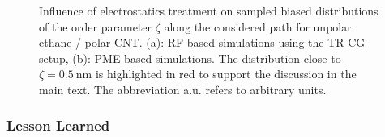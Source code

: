 \documentclass[9pt,lessons,pubversion]{livecoms}
\begin{document}
\begin{figure}[htb!]
  \centering    
  \caption{
  Influence of electrostatics treatment on sampled biased distributions of the order parameter $\zeta$ along the considered path for unpolar ethane / polar CNT. 
  (a): RF-based simulations using the TR-CG setup, (b): PME-based simulations. The distribution close to $\zeta =0.5~\mathrm{nm}$ is highlighted in red to support the discussion in the main text. 
  The abbreviation a.u. refers to arbitrary units.
}  
\label{fig:polCNT_unpLig_estimator_distrib}
\end{figure}


\subsubsection*{Lesson Learned}
\end{document}
